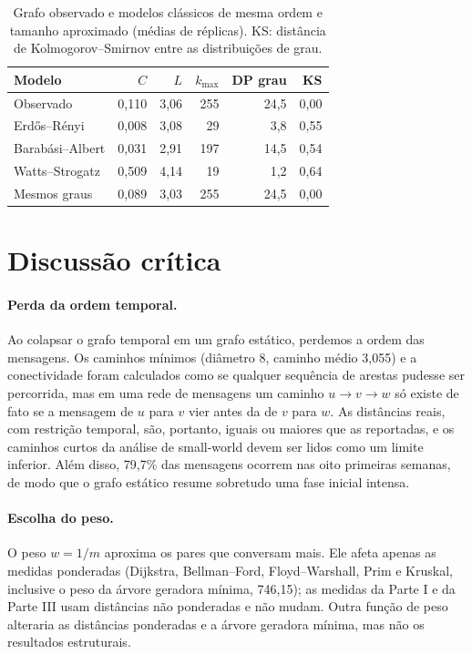 \documentclass[sigconf]{webmedia}
\newcommand{\diametro}{8}
\newcommand{\caminhoMedio}{3{,}055}
\newcommand{\pesoMST}{746{,}15}
\newcommand{\primeirasOitoSem}{79{,}7\%}
\begin{document}
\begin{table}[t]
  \caption{Grafo observado e modelos clássicos de mesma ordem e tamanho aproximado (médias de réplicas). KS: distância de Kolmogorov--Smirnov entre as distribuições de grau.}
  \label{tab:modelos}
  \small
  \setlength{\tabcolsep}{4pt}
  \begin{tabular}{lrrrrr}
    \toprule
    Modelo & $C$ & $L$ & $k_{\max}$ & DP grau & KS \\
    \midrule
    Observado & 0,110 & 3,06 & 255 & 24,5 & 0,00 \\
    \midrule
    Erd\H{o}s--R\'enyi & 0,008 & 3,08 & 29 & 3,8 & 0,55 \\
    Barab\'asi--Albert & 0,031 & 2,91 & 197 & 14,5 & 0,54 \\
    Watts--Strogatz & 0,509 & 4,14 & 19 & 1,2 & 0,64 \\
    \midrule
    Mesmos graus & 0,089 & 3,03 & 255 & 24,5 & 0,00 \\
    \bottomrule
  \end{tabular}
\end{table}

\FloatBarrier
\section{Discussão crítica}
\paragraph{Perda da ordem temporal.} Ao colapsar o grafo temporal em um grafo estático, perdemos a ordem das mensagens. Os caminhos mínimos (diâmetro \diametro, caminho médio \caminhoMedio) e a conectividade foram calculados como se qualquer sequência de arestas pudesse ser percorrida, mas em uma rede de mensagens um caminho $u\to v\to w$ só existe de fato se a mensagem de $u$ para $v$ vier antes da de $v$ para $w$. As distâncias reais, com restrição temporal, são, portanto, iguais ou maiores que as reportadas, e os caminhos curtos da análise de small-world devem ser lidos como um limite inferior. Além disso, \primeirasOitoSem{} das mensagens ocorrem nas oito primeiras semanas, de modo que o grafo estático resume sobretudo uma fase inicial intensa.

\paragraph{Escolha do peso.} O peso $w=1/m$ aproxima os pares que conversam mais. Ele afeta apenas as medidas ponderadas (Dijkstra, Bellman--Ford, Floyd--Warshall, Prim e Kruskal, inclusive o peso da árvore geradora mínima, \pesoMST{}); as medidas da Parte I e da Parte III usam distâncias não ponderadas e não mudam. Outra função de peso alteraria as distâncias ponderadas e a árvore geradora mínima, mas não os resultados estruturais.
\end{document}
